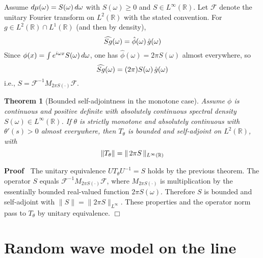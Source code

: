 \documentclass{article}
\newcommand{\cdummy}{\cdot}
\newenvironment{proof}{\noindent\textbf{Proof\ }}{\hspace*{\fill}$\Box$\medskip}
{\theorembodyfont{\rmfamily}\newtheorem{example}{Example}}
\newtheorem{theorem}{Theorem}
\begin{document}
Assume $d \mu (\omega) = S (\omega)  \hspace{0.17em} d \omega$ with $S
(\omega) \ge 0$ and $S \in L^{\infty} (\mathbb{R})$. Let $\mathcal{F}$ denote
the unitary Fourier transform on $L^2 (\mathbb{R})$ with the stated
convention. For $g \in L^2 (\mathbb{R}) \cap L^1 (\mathbb{R})$ (and then by
density),
\begin{equation}
  \widehat{Sg} (\omega) = \hat{\phi} (\omega)  \hspace{0.17em} \hat{g}
  (\omega)
\end{equation}
Since $\phi (x) = \int e^{i \omega x} S (\omega)  \hspace{0.17em} d \omega$,
one has $\hat{\phi} (\omega) = 2 \pi S (\omega)$ almost everywhere, so
\begin{equation}
  \widehat{Sg} (\omega) = (2 \pi) S (\omega)  \hspace{0.17em} \hat{g} (\omega)
\end{equation}
i.e., $S =\mathcal{F}^{- 1} M_{2 \pi S (\cdummy)} \mathcal{F}$.

\begin{theorem}
  [Bounded self-adjointness in the monotone case] Assume $\phi$ is continuous
  and positive definite with absolutely continuous spectral density $S
  (\omega) \in L^{\infty} (\mathbb{R})$. If $\theta$ is strictly monotone and
  absolutely continuous with $\theta' (s) > 0$ almost everywhere, then
  $T_{\theta}$ is bounded and self-adjoint on $L^2 (\mathbb{R})$, with
  \begin{equation}
    \|T_{\theta} \| = \| \hspace{0.17em} 2 \pi S \hspace{0.17em}
    \|_{L^{\infty} (\mathbb{R})}
  \end{equation}
\end{theorem}

\begin{proof}
  The unitary equivalence $UT_{\theta} U^{- 1} = S$ holds by the previous
  theorem. The operator $S$ equals $\mathcal{F}^{- 1} M_{2 \pi S (\cdummy)}
  \mathcal{F}$, where $M_{2 \pi S (\cdummy)}$ is multiplication by the
  essentially bounded real-valued function $2 \pi S (\omega)$. Therefore $S$
  is bounded and self-adjoint with $\|S\| = \|2 \pi S\|_{L^{\infty}}$. These
  properties and the operator norm pass to $T_{\theta}$ by unitary
  equivalence.
\end{proof}

\section{Random wave model on the line}
\end{document}
